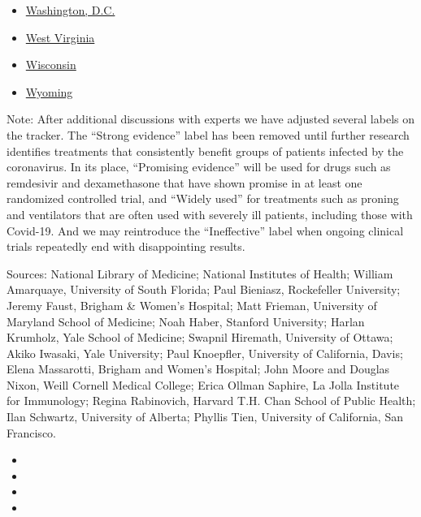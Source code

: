 \begin{itemize}
\item
  \href{https://www.nytimes3xbfgragh.onion/interactive/2020/us/washington-dc-coronavirus-cases.html}{Washington,
  D.C.}
\item
  \href{https://www.nytimes3xbfgragh.onion/interactive/2020/us/west-virginia-coronavirus-cases.html}{West
  Virginia}
\item
  \href{https://www.nytimes3xbfgragh.onion/interactive/2020/us/wisconsin-coronavirus-cases.html}{Wisconsin}
\item
  \href{https://www.nytimes3xbfgragh.onion/interactive/2020/us/wyoming-coronavirus-cases.html}{Wyoming}
\end{itemize}

Note: After additional discussions with experts we have adjusted several
labels on the tracker. The ``Strong evidence'' label has been removed
until further research identifies treatments that consistently benefit
groups of patients infected by the coronavirus. In its place,
``Promising evidence'' will be used for drugs such as remdesivir and
dexamethasone that have shown promise in at least one randomized
controlled trial, and ``Widely used'' for treatments such as proning and
ventilators that are often used with severely ill patients, including
those with Covid-19. And we may reintroduce the ``Ineffective'' label
when ongoing clinical trials repeatedly end with disappointing results.

Sources: National Library of Medicine; National Institutes of Health;
William Amarquaye, University of South Florida; Paul Bieniasz,
Rockefeller University; Jeremy Faust, Brigham \& Women's Hospital; Matt
Frieman, University of Maryland School of Medicine; Noah Haber, Stanford
University; Harlan Krumholz, Yale School of Medicine; Swapnil Hiremath,
University of Ottawa; Akiko Iwasaki, Yale University; Paul Knoepfler,
University of California, Davis; Elena Massarotti, Brigham and Women's
Hospital; John Moore and Douglas Nixon, Weill Cornell Medical College;
Erica Ollman Saphire, La Jolla Institute for Immunology; Regina
Rabinovich, Harvard T.H. Chan School of Public Health; Ilan Schwartz,
University of Alberta; Phyllis Tien, University of California, San
Francisco.

\begin{itemize}
\item
\item
\item
\item
\end{itemize}

